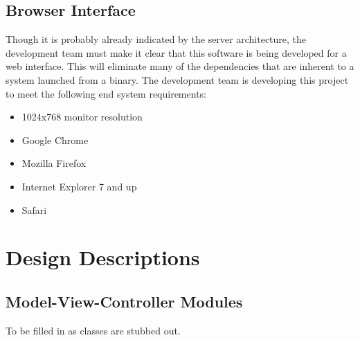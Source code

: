 \documentclass[letterpaper]{article}
\begin{document}
\subsection{Browser Interface}
Though it is probably already indicated by the server architecture, the development team must make it clear that this software is being developed for a web interface. This will eliminate many of the dependencies that are inherent to a system launched from a binary. The development team is developing this project to meet the following end system requirements:
\begin{itemize}
\item 1024x768 monitor resolution
\item Google Chrome
\item Mozilla Firefox
\item Internet Explorer 7 and up
\item Safari
\end{itemize}
\section{Design Descriptions}
\subsection{Model-View-Controller Modules}
To be filled in as classes are stubbed out.
\end{document}
